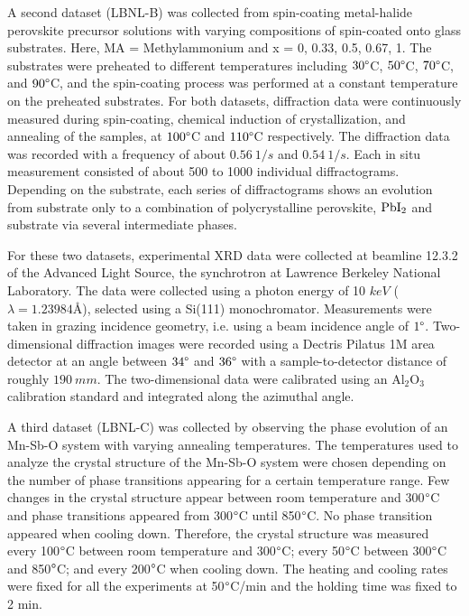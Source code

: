 A second dataset (LBNL-B) was collected from spin-coating metal-halide perovskite precursor solutions with varying compositions of  spin-coated onto glass substrates. Here, MA = Methylammonium and x = 0, 0.33, 0.5, 0.67, 1. The substrates were preheated to different temperatures including $30\degree $C, $50\degree $C, $70\degree $C, and $90\degree $C, and the spin-coating process was performed at a constant temperature on the preheated substrates. For both datasets, diffraction data were continuously measured during spin-coating, chemical induction of crystallization, and annealing of the samples, at $100\degree$C and $110\degree$C respectively. The diffraction data was recorded with a frequency of about $0.56 
 \ 1/\si{s}$ and $0.54 \ 1/\si{s}$. Each in situ measurement consisted of about 500 to 1000 individual diffractograms. Depending on the substrate, each series of diffractograms shows an evolution from substrate only to a combination of polycrystalline perovskite, $\ce{PbI2}$ and substrate via several intermediate phases.

For these two datasets, experimental XRD data were collected at beamline 12.3.2 of the Advanced Light Source, the synchrotron at Lawrence Berkeley National Laboratory. The data were collected using a photon energy of 10 $\si{keV}$ ($\lambda = 1.23984 \text{\AA}$), selected using a Si(111) monochromator. Measurements were taken in grazing incidence geometry, i.e. using a beam incidence angle of $1\degree$. Two-dimensional diffraction images were recorded using a Dectris Pilatus 1M area detector at an angle between $34\degree$ and $36\degree$ with a sample-to-detector distance of roughly $190 \ \si{mm}$. The two-dimensional data were calibrated using an Al$_{2}$O$_{3}$ calibration standard and integrated along the azimuthal angle.


A third dataset (LBNL-C) was collected by observing the phase evolution of an Mn-Sb-O system with varying annealing temperatures. The temperatures used to analyze the crystal structure of the Mn-Sb-O system were chosen depending on the number of phase transitions appearing for a certain temperature range. Few changes in the crystal structure appear between room temperature and 300$\degree$C and phase transitions appeared from 300$\degree$C until 850$\degree$C. No phase transition appeared when cooling down. Therefore, the crystal structure was measured every 100$\degree$C between room temperature and 300$\degree$C; every 50$\degree$C between 300$\degree$C and 850$\degree$C; and every 200$\degree$C when cooling down. The heating and cooling rates were fixed for all the experiments at 50$\degree$C/min and the holding time was fixed to 2 min.

